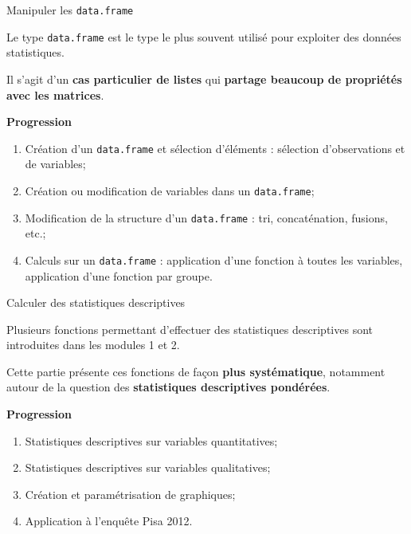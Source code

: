 \documentclass[12pt,ignorenonframetext,]{beamer}
\newcommand{\strong}[1]{\textbf{\textcolor{redInsee}{#1}}}
\begin{document}
\begin{frame}[fragile]{Manipuler les \texttt{data.frame}}

Le type \texttt{data.frame} est le type le plus souvent utilisé pour
exploiter des données statistiques.

\pause Il s'agit d'un \textbf{cas particulier de listes} qui
\textbf{partage beaucoup de propriétés avec les matrices}.

\bigskip \pause \strong{Progression}

\begin{enumerate}
\def\labelenumi{\arabic{enumi}.}
\item
  Création d'un \texttt{data.frame} et sélection d'éléments : sélection
  d'observations et de variables;
\item
  \pause Création ou modification de variables dans un
  \texttt{data.frame};
\item
  \pause Modification de la structure d'un \texttt{data.frame} : tri,
  concaténation, fusions, etc.;
\item
  \pause Calculs sur un \texttt{data.frame} : application d'une fonction
  à toutes les variables, application d'une fonction par groupe.
\end{enumerate}

\end{frame}

\begin{frame}{Calculer des statistiques descriptives}

Plusieurs fonctions permettant d'effectuer des statistiques descriptives
sont introduites dans les modules 1 et 2.

\pause Cette partie présente ces fonctions de façon \textbf{plus
systématique}, notamment autour de la question des \textbf{statistiques
descriptives pondérées}.

\bigskip \pause \strong{Progression}

\begin{enumerate}
\def\labelenumi{\arabic{enumi}.}
\item
  Statistiques descriptives sur variables quantitatives;
\item
  Statistiques descriptives sur variables qualitatives;
\item
  Création et paramétrisation de graphiques;
\item
  \pause Application à l'enquête Pisa 2012.
\end{enumerate}

\end{frame}
\end{document}
